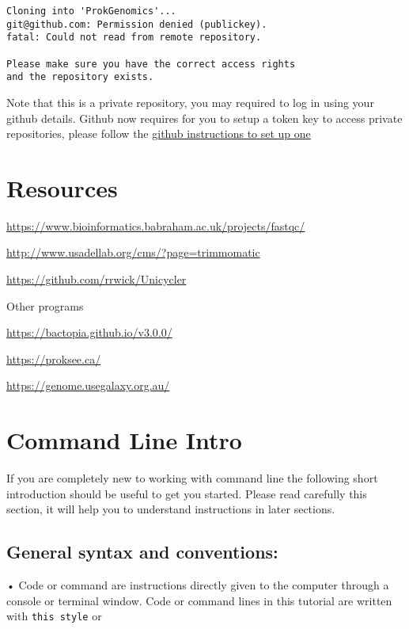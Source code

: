 \documentclass[
]{book}
\begin{document}
\begin{verbatim}
Cloning into 'ProkGenomics'...
git@github.com: Permission denied (publickey).
fatal: Could not read from remote repository.

Please make sure you have the correct access rights
and the repository exists.
\end{verbatim}

Note that this is a private repository, you may required to log in using your github details. Github now requires for you to setup a token key to access private repositories, please follow the \href{https://docs.github.com/en/authentication/keeping-your-account-and-data-secure/managing-your-personal-access-tokens}{github instructions to set up one}

\hypertarget{resources}{%
\chapter{Resources}\label{resources}}

\url{https://www.bioinformatics.babraham.ac.uk/projects/fastqc/}

\url{http://www.usadellab.org/cms/?page=trimmomatic}

\url{https://github.com/rrwick/Unicycler}

Other programs

\url{https://bactopia.github.io/v3.0.0/}

\url{https://proksee.ca/}

\url{https://genome.usegalaxy.org.au/}

\hypertarget{command-line-intro}{%
\chapter{Command Line Intro}\label{command-line-intro}}

If you are completely new to working with command line the following short introduction should be useful to get you started. Please read carefully this section, it will help you to understand instructions in later sections.

\hypertarget{general-syntax-and-conventions}{%
\section{General syntax and conventions:}\label{general-syntax-and-conventions}}

• Code or command are instructions directly given to the computer through a console or terminal window. Code or command lines in this tutorial are written with \texttt{this\ style} or
\end{document}
